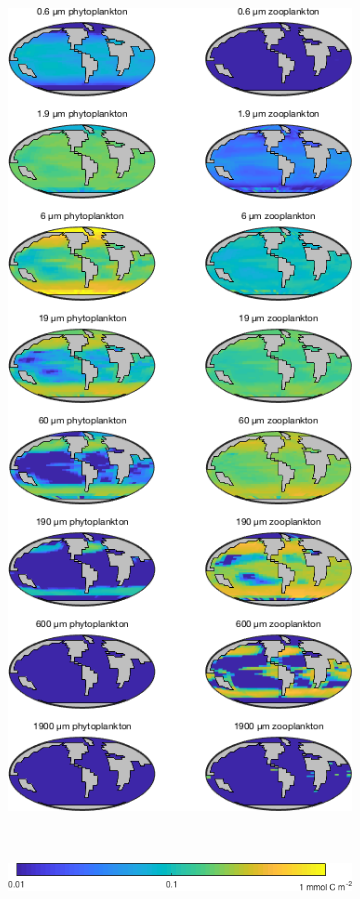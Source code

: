 \documentclass{article}
\begin{document}
\begin{figure}[htbp]
\centering
\begin{subfigure}{.66\textwidth}
\includegraphics[width=0.8\linewidth]{../Separate_figures/ECOGEM/SizeClass_C_Biomass.png}
\end{subfigure} 
\\[+0.2cm]
\begin{subfigure}{.66\textwidth}
\includegraphics[width=0.8\linewidth]{../Separate_figures/ECOGEM/SizeClass_C_Biomass_clrbar.png}
\end{subfigure}
\end{figure}
\end{document}
